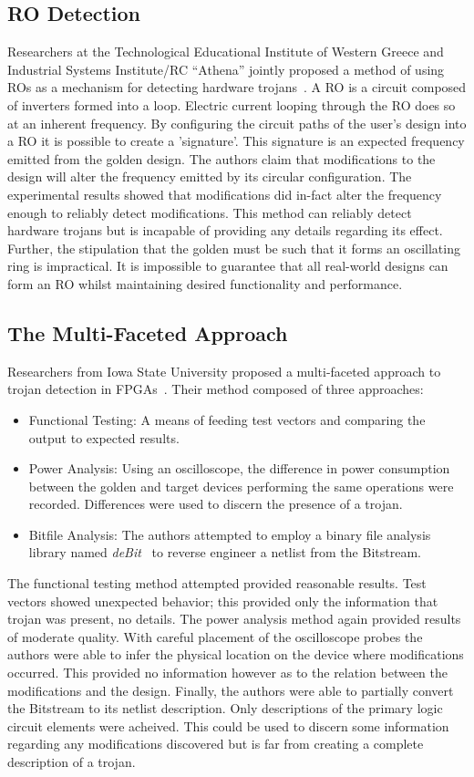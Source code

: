 \subsection{\acrfull{RO} Detection}
Researchers at the Technological Educational Institute of Western Greece and Industrial Systems Institute/RC “Athena” jointly proposed a method of using \acrfull{ROs} as a mechanism for detecting hardware trojans~\cite{ringOscillatorMethod}.
A \acrshort{RO} is a circuit composed of inverters formed into a loop.
Electric current looping through the \acrshort{RO} does so at an inherent frequency.
By configuring the circuit paths of the user's design into a \acrshort{RO} it is possible to create a 'signature'.
This signature is an expected frequency emitted from the \gls{golden} design. 
The authors claim that modifications to the design will alter the frequency emitted by its circular configuration.
The experimental results showed that modifications did in-fact alter the frequency enough to reliably detect modifications.
This method can reliably detect hardware trojans but is incapable of providing any details regarding its effect.
Further, the stipulation that the \gls{golden} must be such that it forms an oscillating ring is impractical.
It is impossible to guarantee that all real-world designs can form an \acrshort{RO} whilst maintaining desired functionality and performance.
\subsection{The Multi-Faceted Approach}
Researchers from Iowa State University proposed a multi-faceted approach to trojan detection in \acrshort{FPGA}s~\cite{multiFacetedApproach}.
Their method composed of three approaches:
\begin{itemize}
	\item Functional Testing: A means of feeding test vectors and comparing the output to expected results.
	\item Power Analysis: Using an oscilloscope, the difference in power consumption between the \gls{golden} and \gls{target} devices performing the same operations were recorded. Differences were used to discern the presence of a trojan.
	\item Bitfile Analysis: The authors attempted to employ a binary file analysis library named \textit{deBit}~\cite{bitStreamToNetlist} to reverse engineer a netlist from the \gls{Bitstream}.
\end{itemize}
The functional testing method attempted provided reasonable results. 
Test vectors showed unexpected behavior; this provided only the information that trojan was present, no details.
The power analysis method again provided results of moderate quality.
With careful placement of the oscilloscope probes the authors were able to infer the physical location on the device where modifications occurred.
This provided no information however as to the relation between the modifications and the design.
Finally, the authors were able to partially convert the \gls{Bitstream} to its netlist description.
Only descriptions of the primary logic circuit elements were acheived.
This could be used to discern some information regarding any modifications discovered but is far from creating a complete description of a trojan.


\setlength{\unitlength}{\savedunitlength}